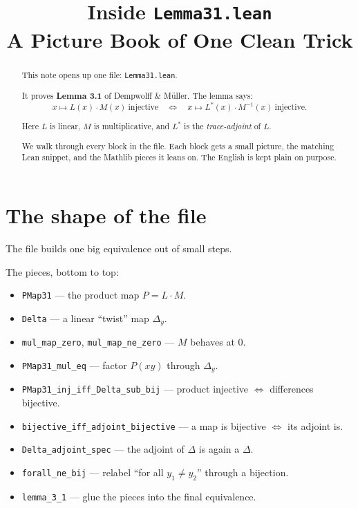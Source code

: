 \documentclass[11pt]{article}
\title{\bf Inside \texttt{Lemma31.lean}\\[3pt]
  \large A Picture Book of One Clean Trick}
\author{}
\date{}
\begin{document}
\maketitle

\begin{abstract}\noindent
This note opens up one file: \texttt{Lemma31.lean}.

It proves \textbf{Lemma 3.1} of Dempwolff \& M\"uller.
The lemma says:
\[
  x \mapsto L(x)\cdot M(x)\ \text{injective}
  \quad\Longleftrightarrow\quad
  x \mapsto L^{*}(x)\cdot M^{-1}(x)\ \text{injective}.
\]

Here $L$ is linear, $M$ is multiplicative, and $L^{*}$ is the
\emph{trace-adjoint} of $L$.

We walk through every block in the file.
Each block gets a small picture, the matching Lean snippet, and the
Mathlib pieces it leans on.
The English is kept plain on purpose.
\end{abstract}

\bigskip

\section{The shape of the file}

The file builds one big equivalence out of small steps.

The pieces, bottom to top:

\begin{itemize}
  \item \texttt{PMap31} --- the product map $P = L\cdot M$.
  \item \texttt{Delta} --- a linear ``twist'' map $\Delta_y$.
  \item \texttt{mul\_map\_zero}, \texttt{mul\_map\_ne\_zero} --- $M$ behaves at $0$.
  \item \texttt{PMap31\_mul\_eq} --- factor $P(xy)$ through $\Delta_y$.
  \item \texttt{PMap31\_inj\_iff\_Delta\_sub\_bij} --- product injective $\Leftrightarrow$ differences bijective.
  \item \texttt{bijective\_iff\_adjoint\_bijective} --- a map is bijective $\Leftrightarrow$ its adjoint is.
  \item \texttt{Delta\_adjoint\_spec} --- the adjoint of $\Delta$ is again a $\Delta$.
  \item \texttt{forall\_ne\_bij} --- relabel ``for all $y_1\neq y_2$'' through a bijection.
  \item \texttt{lemma\_3\_1} --- glue the pieces into the final equivalence.
\end{itemize}
\end{document}
